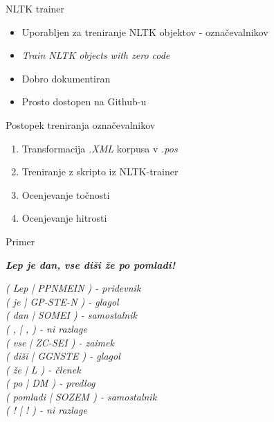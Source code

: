 \documentclass{beamer}
\begin{document}
\begin{frame}{NLTK trainer}
\begin{itemize}
\item Uporabljen za treniranje NLTK objektov - označevalnikov
\item \textit{Train NLTK objects with zero code}
\item Dobro dokumentiran
\item Prosto dostopen na Github-u
\end{itemize}
\end{frame}

\begin{frame}{Postopek treniranja označevalnikov}
\begin{enumerate}
\item Transformacija \textit{.XML} korpusa v \textit{.pos}
\item Treniranje z skripto iz NLTK-trainer
\item Ocenjevanje točnosti
\item Ocenjevanje hitrosti
\end{enumerate}
\end{frame}

\begin{frame}{Primer}
\begin{center}
\textit{\textbf{Lep je dan, vse diši že po pomladi!}}
\end{center}
\textit{( Lep  |  PPNMEIN ) - pridevnik\\
	( je  |  GP-STE-N ) - glagol\\
	( dan  |  SOMEI ) - samostalnik\\
	( ,  |  , ) - ni razlage\\
	( vse  |  ZC-SEI ) - zaimek\\
	( diši  |  GGNSTE ) - glagol\\
	( že  |  L ) - členek\\
	( po  |  DM ) - predlog\\
	( pomladi  |  SOZEM ) - samostalnik\\
	( !  |  ! ) - ni razlage}\\
\end{frame}
\end{document}
